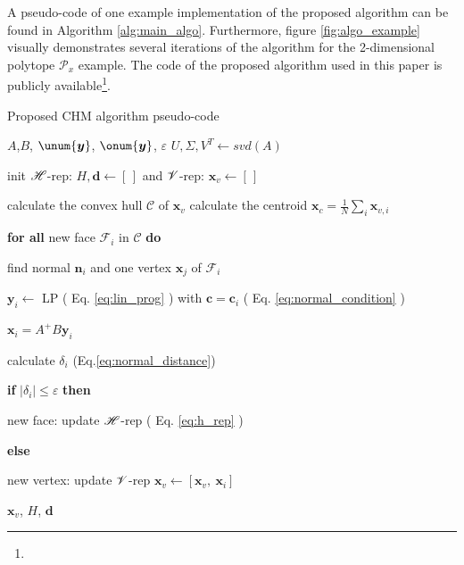 A pseudo-code of one example implementation of the proposed algorithm can be found in Algorithm \ref{alg:main_algo}. Furthermore, figure \ref{fig:algo_example} visually demonstrates several iterations of the algorithm for the 2-dimensional polytope $\mathcal{P}_x$ example. The code of the proposed algorithm used in this paper is publicly available\footnote{}.

\begin{algorithm}[!h]
\caption{Proposed CHM algorithm pseudo-code}
\begin{algorithmic}
\REQUIRE $A$,$B$, $\unum{\bm{y}}$, $\onum{\bm{y}}$, $\varepsilon$
\STATE $U, \Sigma, V^T \leftarrow svd(A)$ 

\STATE init $\mathscr{H}$-rep: $H,\bm{d} \leftarrow [\,]$ and $\mathscr{V}$-rep: $\bm{x}_v\leftarrow [\,]$
\REPEAT

\STATE calculate the convex hull $\mathcal{C}$ of $\bm{x}_{v}$
\STATE calculate the centroid $\bm{x}_{c} = \frac{1}{N}\sum_i\bm{x}_{v,i}$

\STATE \textbf{for all}   {new face $\mathcal{F}_i$ in $\mathcal{C}$} \textbf{do}

\hspace{0.25cm} find normal $\bm{n}_i$ and one vertex $\bm{x}_{j}$ of $\mathcal{F}_i$

\hspace{0.25cm} $\bm{y}_{i}\leftarrow$ LP ( Eq. \ref{eq:lin_prog} ) with  $\bm{c}\! =\! \bm{c}_i$ ( Eq. \ref{eq:normal_condition} )

\hspace{0.25cm} $\bm{x}_{i} = A^+B\bm{y}_i$ 

\hspace{0.25cm}  calculate $\delta_i$ (Eq.\ref{eq:normal_distance})

\hspace{0.25cm}  \textbf{if}   $ |\delta_i| \leq \varepsilon$ \textbf{then} 

\hspace{0.6cm}  new face: update $\mathscr{H}$-rep  ( Eq. \ref{eq:h_rep} )

\hspace{0.25cm}  \textbf{else}

\hspace{0.6cm} new vertex: update $\mathscr{V}$-rep $\bm{x}_{v} \!\leftarrow\! [\bm{x}_{v},~ \bm{x}_i ]$ 

{}
\RETURN $\bm{x}_v$, $H$, $\bm{d}$ 
\end{algorithmic}
\label{alg:main_algo}
\end{algorithm}

